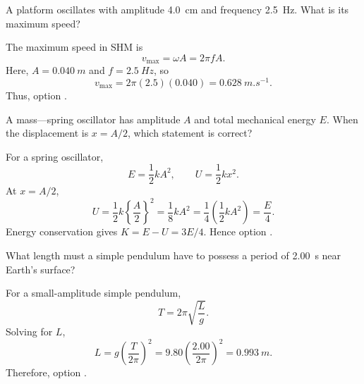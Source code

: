 \begin{quizquestion}[
  id=phy104-osc-003,
  topic=oscillations,
  difficulty=foundation,
  marks=1,
  correct=D,
  tags={shm,maximum-speed,frequency},
  outcome={Calculate maximum speed from amplitude and frequency}
]
  A platform oscillates with amplitude \SI{4.0}{cm} and frequency \SI{2.5}{Hz}. What is its maximum speed?
\end{quizquestion}
\begin{quizsolution}
  The maximum speed in SHM is
    \[
      v_{\max}=\omega A=2\pi fA.
    \]
    Here, \(A=\SI{0.040}{m}\) and \(f=\SI{2.5}{Hz}\), so
    \[
      v_{\max}=2\pi(2.5)(0.040)=\SI{0.628}{m.s^{-1}}.
    \]
    Thus, option \textbf{\quizcorrectletter}.
\end{quizsolution}

\begin{quizquestion}[
  id=phy104-osc-004,
  topic=oscillations,
  difficulty=foundation,
  marks=1,
  correct=B,
  tags={shm,energy,displacement},
  outcome={Partition oscillator energy at a specified displacement}
]
  A mass—spring oscillator has amplitude \(A\) and total mechanical energy \(E\). When the displacement is \(x=A/2\), which statement is correct?
\end{quizquestion}
\begin{quizsolution}
  For a spring oscillator,
    \[
      E=\frac12 kA^2,\qquad U=\frac12 kx^2.
    \]
    At \(x=A/2\),
    \[
      U=\frac12 k{\left\{\frac{A}{2}\right\}}^2
      =\frac18 kA^2
      =\frac14\left(\frac12 kA^2\right)
      =\frac{E}{4}.
    \]
    Energy conservation gives \(K=E-U=3E/4\). Hence option \textbf{\quizcorrectletter}.
\end{quizsolution}

\begin{quizquestion}[
  id=phy104-osc-005,
  topic=oscillations,
  difficulty=foundation,
  marks=1,
  correct=A,
  tags={pendulum,period,length},
  outcome={Determine pendulum length from its period}
]
  What length must a simple pendulum have to possess a period of \SI{2.00}{s} near Earth's surface?
\end{quizquestion}
\begin{quizsolution}
  For a small-amplitude simple pendulum,
    \[
      T=2\pi\sqrt{\frac{L}{g}}.
    \]
    Solving for \(L\),
    \[
      L=g{\left(\frac{T}{2\pi}\right)}^2
      =9.80{\left(\frac{2.00}{2\pi}\right)}^2
      =\SI{0.993}{m}.
    \]
    Therefore, option \textbf{\quizcorrectletter}.
\end{quizsolution}

